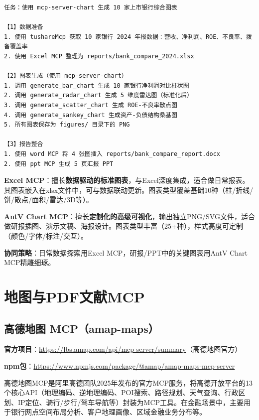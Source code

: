 \begin{lstlisting}
任务：使用 mcp-server-chart 生成 10 家上市银行综合图表

【1】数据准备
1. 使用 tushareMcp 获取 10 家银行 2024 年报数据：营收、净利润、ROE、不良率、拨备覆盖率
2. 使用 Excel MCP 整理为 reports/bank_compare_2024.xlsx

【2】图表生成（使用 mcp-server-chart）
1. 调用 generate_bar_chart 生成 10 家银行净利润对比柱状图
2. 调用 generate_radar_chart 生成 5 维度雷达图（标准化后）
3. 调用 generate_scatter_chart 生成 ROE-不良率散点图
4. 调用 generate_sankey_chart 生成资产-负债结构桑基图
5. 所有图表保存为 figures/ 目录下的 PNG

【3】报告整合
1. 使用 word MCP 将 4 张图插入 reports/bank_compare_report.docx
2. 使用 ppt MCP 生成 5 页汇报 PPT
\end{lstlisting}

\begin{theorybox}
\textbf{Excel MCP}：擅长\textbf{数据驱动的标准图表}，与Excel深度集成，适合做日常报表。其图表嵌入在xlsx文件中，可与数据联动更新。图表类型覆盖基础10种（柱/折线/饼/散点/面积/雷达/3D等）。

\textbf{AntV Chart MCP}：擅长\textbf{定制化的高级可视化}，输出独立PNG/SVG文件，适合做研报插图、演示文稿、海报设计。图表类型丰富（25+种），样式高度可定制（颜色/字体/标注/交互）。

\textbf{协同策略}：日常数据探索用Excel MCP，研报/PPT中的关键图表用AntV Chart MCP精雕细琢。
\end{theorybox}

\section{地图与PDF文献MCP}

\subsection{高德地图 MCP（amap-maps）}

\textbf{官方项目}：\url{https://lbs.amap.com/api/mcp-server/summary}（高德地图官方）

\textbf{npm包}：\url{https://www.npmjs.com/package/@amap/amap-maps-mcp-server}

高德地图MCP是阿里高德团队2025年发布的官方MCP服务，将高德开放平台的13个核心API（地理编码、逆地理编码、POI搜索、路径规划、天气查询、行政区划、IP定位、骑行/步行/驾车导航等）封装为MCP工具。在金融场景中，主要用于银行网点空间布局分析、客户地理画像、区域金融业务分布等。

